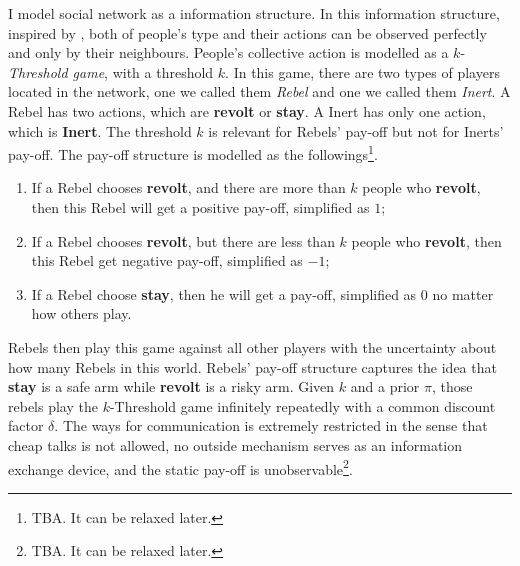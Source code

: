 \documentclass[12pt,letter]{article}
\theoremstyle{definition}
\theoremstyle{remark}
\theoremstyle{claim}
\begin{document}
I model social network as a information structure. In this information structure, inspired by \citep{chwe2000}, {both} of people's type and their actions can be observed {perfectly and only} by their neighbours. People's collective action is modelled as a $k$-\textit{Threshold game}, with a threshold $k$. In this game, there are two types of players located in the network, one we called them \textit{Rebel} and one we called them \textit{Inert}. A Rebel has two actions, which are \textbf{revolt} or \textbf{stay}. A Inert has only one action, which is \textbf{Inert}. The threshold $k$ is relevant for Rebels' pay-off but not for Inerts' pay-off. The pay-off structure is modelled as the followings\footnote{TBA. It can be relaxed later.}. 
\begin{enumerate}
\item If a Rebel chooses \textbf{revolt}, and there are more than $k$ people who \textbf{revolt}, then this Rebel will get a positive pay-off, simplified as $1$;
\item If a Rebel chooses \textbf{revolt}, but there are less than $k$ people who \textbf{revolt}, then this Rebel get negative pay-off, simplified  as $-1$;
\item If a Rebel choose \textbf{stay}, then he will get a pay-off, simplified as $0$ no matter how others play.
\end{enumerate}
Rebels then play this game against all other players with the uncertainty about how many Rebels in this world. Rebels' pay-off structure captures the idea that \textbf{stay} is a safe arm while \textbf{revolt} is a risky arm. Given $k$ and a prior $\pi$, those rebels play the $k$-Threshold game infinitely repeatedly with a common discount factor $\delta$. The ways for communication is extremely restricted in the sense that cheap talks is not allowed, no outside mechanism serves as an information exchange device, and the static pay-off is unobservable\footnote{TBA. It can be relaxed later.}.
\end{document}
